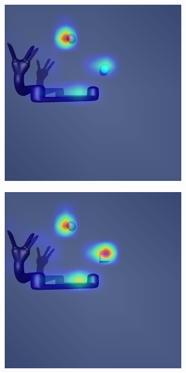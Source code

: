 \begin{figure}
\begin{subfigure}{0.24\columnwidth}
    \includegraphics[width=\linewidth]{figures/chapter6/distractor_saliency_jaco_pro_off/color_visual_std}
  \end{subfigure}
  \begin{subfigure}{0.24\columnwidth}
    \includegraphics[width=\linewidth]{figures/chapter6/distractor_saliency_jaco_pro_off/shape_visual_std}

\end{subfigure}
\end{figure}
